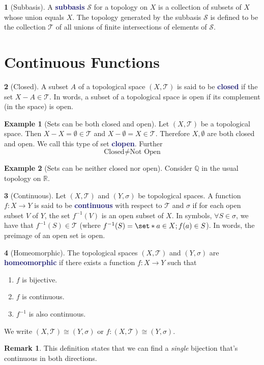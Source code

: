 \documentclass[11pt]{article}
\numberwithin{equation}{section}
\newcommand{\navy}[1]{\textcolor{MidnightBlue}{\bf #1}}
\theoremstyle{plain}
\theoremstyle{definition}
\newtheorem{definition}{\color{MidnightBlue}{\textbf{Definition}}}[section]
\newtheorem{example}{\color{WildStrawberry}Example}[section]
\newtheorem*{remark}{Remark}
\newcommand\inv[1]{#1^{-1}}
\def\Set{\set*}%
\newcommand{\1}{\mathbbm 1}
\newcommand{\RR}{\mathbb R}
\newcommand{\QQ}{\mathbb Q}
\newcommand{\sS}{\mathscr S}
\newcommand{\tT}{\mathcal T}
\begin{document}
\begin{definition}[Subbasis]
	A \navy{subbasis} $\sS$ for a topology on $X$ is a collection of subsets of $X$ whose union equals $X$. The topology generated by the subbasis $\sS$ is defined to be the collection $\tT$ of all unions of finite intersections of elements of $\sS$.
\end{definition}

\section{Continuous Functions}

\begin{definition}[Closed]
	A subset $A$ of a topological space $(X,\tT)$ is said to be \navy{closed} if the set $X - A \in \tT$. In words, a subset of a topological space is open if its complement (in the space) is open. 
\end{definition}

\begin{example}[Sets can be both closed and open]
	Let $(X,\tT)$ be a topological space. Then $X - X = \emptyset \in \tT$ and $X - \emptyset = X \in \tT$. Therefore $X, \emptyset$ are both closed and open. We call this type of set \navy{clopen}. Further
	\begin{equation}
		\text{Closed} \neq \text{Not Open}
	\end{equation}
\end{example}

\begin{example}[Sets can be neither closed nor open]
	Consider $\QQ$ in the usual topology on $\RR$. 
\end{example}


\begin{definition}[Continuous]
	Let $(X,\tT)$ and $(Y,\sigma)$ be topological spaces. A function $f : X \to Y$ is said to be \navy{continuous} with respect to $\tT$ and $\sigma$ if for each open subset $V$ of $Y$, the set $f^{-1}(V)$ is an open subset of $X$. In symbols, $\forall S \in \sigma$, we have that $\inv{f}(S) \in \tT$ (where $\inv{f}(S) = \Set{a \in X; f(a) \in S}$). In words, the preimage of an open set is open. 
\end{definition}

\begin{definition}[Homeomorphic]
	The topological spaces $(X,\tT)$ and $(Y,\sigma)$ are \navy{homeomorphic} if there exists a function $f: X \to Y$ such that 
	\begin{enumerate}
		\item $f$ is bijective.
		\item $f$ is continuous.
		\item $\inv{f}$ is also continuous. 
	\end{enumerate}
	We write $(X,\tT) \cong (Y,\sigma)$ or $f: (X,\tT) \cong (Y,\sigma)$. 
\end{definition}
\begin{remark}
	This definition states that we can find a \emph{single} bijection that's continuous in both directions. 
\end{remark}
\end{document}
